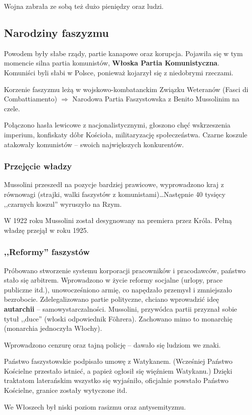 \documentclass [a4paper, 11pt, oneside]{book}
\begin{document}
		Wojna zabrała ze sobą też dużo pieniędzy oraz ludzi.

	\subsection{Narodziny faszyzmu}
		Powodem były słabe rządy, partie kanapowe oraz korupcja. Pojawiła się w tym momencie silna partia komunistów, \textbf{Włoska Partia Komunistyczna}. Komuniści byli słabi w Polsce, ponieważ kojarzył się z niedobrymi rzeczami.

		Korzenie faszyzmu leżą w wojskowo-kombatanckim Związku Weteranów (Fasci di Combattiamento) $\Rightarrow$ Narodowa Partia Faszystowska z Benito Mussolinim na czele.

		Połączono hasła lewicowe z nacjonalistycznymi, głoszono chęć wskrzeszenia imperium, konfiskaty dóbr Kościoła, militaryzację społeczeństwa. Czarne koszule atakowały komunistów -- swoich największych konkurentów.

		\subsubsection{Przejęcie władzy}
			Mussolini przeszedł na pozycje bardziej prawicowe, wyprowadzono kraj z równowagi (strajki, walki faszystów z komunistami)\dots Następnie 40 tysięcy ,,czarnych koszul'' wyruszyło na Rzym.

			W 1922 roku Mussolini został desygnowany na premiera przez Króla. Pełną władzę przejął w roku 1925.
		\subsubsection{,,Reformy'' faszystów}
			Próbowano stworzenie systemu korporacji pracowników i pracodawców, państwo stało się arbitrem. Wprowadzono w życie reformy socjalne (urlopy, prace publiczne itd.), unowocześniono armię, co napędzało przemysł i zmniejszało bezrobocie. Zdelegalizowano partie polityczne, chciano wprowadzić ideę \textbf{autarchii} -- samowystarczalności. Mussolini, przywódca partii przyznał sobie tytuł ,,duce'' (włoski odpowiednik F\"{o}hrera). Zachowano mimo to monarchię (monarchia jednoczyła Włochy).

			Wprowadzono cenzurę oraz tajną policję -- dawało się ludziom we znaki.
			
			Państwo faszystowskie podpisało umowę z Watykanem. (Wcześniej Państwo Kościelne przestało istnieć, a papież ogłosił się więźniem Watykanu.) Dzięki traktatom laterańskim wszystko się wyjaśniło, oficjalnie powstało Państwo Kościelne, granice zostały wytyczone itd.

			We Włoszech był niski poziom rasizmu oraz antysemityzmu.
\end{document}
